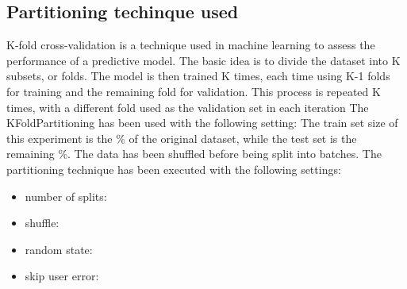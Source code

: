 \documentclass[11pt]{article}
\begin{document}
\subsection{Partitioning techinque used}\label{subsec:partitioning}
K-fold cross-validation is a technique used in machine learning to assess
the performance of a predictive model. The basic idea is to divide the dataset
into K subsets, or folds. The model is then trained K times, each time using K-1
folds for training and the remaining fold for validation. This process is
repeated K times, with a different fold used as the validation set in each iteration
\hfill\break
\hfill\break
The KFoldPartitioning has been used with the following setting:
\hfill\break
\hfill\break
The train set size of this experiment is the \%
of the original dataset, while the test set is the remaining \%.
\hfill\break
\hfill\break
{}
The data has been shuffled before being split into batches.
The partitioning technique has been executed with the following settings:
\begin{itemize}
    \item number of splits: 
    \item shuffle: 
    \item random state: 
    \item skip user error: 
\end{itemize}
\hfill\break
\hfill\break
\end{document}
